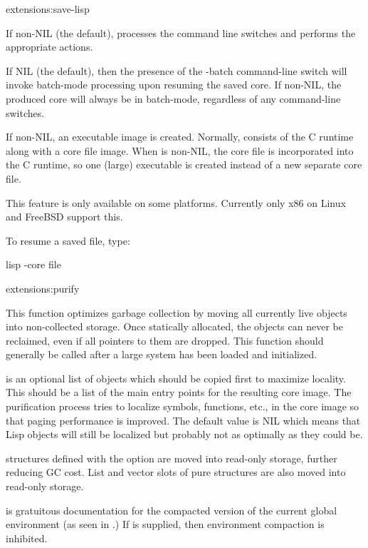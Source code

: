 \begin{defun}{extensions:}{save-lisp}
\begin{Lentry}
  \item[\kwd{process-command-line}] If non-NIL (the default),
    processes the command line switches and performs the appropriate
    actions.

  \item[\kwd{batch-mode}] If NIL (the default), then the presence of
    the -batch command-line switch will invoke batch-mode processing
    upon resuming the saved core.  If non-NIL, the produced core will
    always be in batch-mode, regardless of any command-line switches.

  \item[\kwd{executable}] If non-NIL, an executable image is created.
    Normally, \cmucl{} consists of the C runtime along with a core
    file image.  When  is non-NIL, the core file is
    incorporated into the C runtime, so one (large) executable is
    created instead of a new separate core file.

    This feature is only available on some platforms.  Currently only
    x86 on Linux and FreeBSD support this.
  \end{Lentry}
\end{defun}

To resume a saved file, type:
\begin{example}
lisp -core file
\end{example}

\begin{defun}{extensions:}{purify}{
    }
  
  This function optimizes garbage collection by moving all currently
  live objects into non-collected storage.  Once statically allocated,
  the objects can never be reclaimed, even if all pointers to them are
  dropped.  This function should generally be called after a large
  system has been loaded and initialized.

  \begin{Lentry}
  \item[\kwd{root-structures}] is an optional list of objects which
    should be copied first to maximize locality.  This should be a
    list of the main entry points for the resulting core image.  The
    purification process tries to localize symbols, functions, etc.,
    in the core image so that paging performance is improved.  The
    default value is NIL which means that Lisp objects will still be
    localized but probably not as optimally as they could be.
  
     structures defined with the 
    option are moved into read-only storage, further reducing GC cost.
    List and vector slots of pure structures are also moved into
    read-only storage.
  
  \item[\kwd{environment-name}] is gratuitous documentation for the
    compacted version of the current global environment (as seen in
    .)  If \false{} is supplied, then
    environment compaction is inhibited.
  \end{Lentry}
\end{defun}


